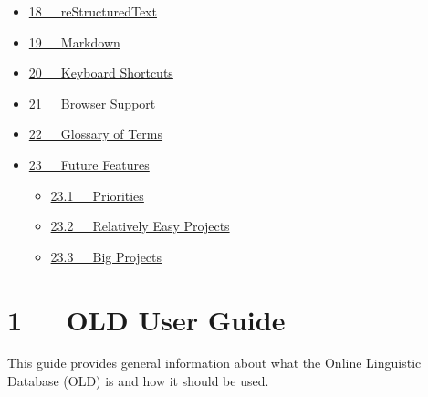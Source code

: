 \documentclass[letterpaper,10pt,english]{sphinxmanual}
\begin{document}
{\begin{minipage}{0.95\linewidth}
\begin{itemize}
\begin{itemize}
\item {} 
{\hyperref[user_guide:old-file-file-markup]{17.3   OLD File file Markup}}

\item {} 
{\hyperref[user_guide:old-image-embed-markup]{17.4   OLD Image Embed Markup}}

\item {} 
{\hyperref[user_guide:old-metalanguage-markup]{17.5   OLD Metalanguage Markup}}

\end{itemize}

\item {} 
{\hyperref[user_guide:restructuredtext]{18   reStructuredText}}

\item {} 
{\hyperref[user_guide:markdown]{19   Markdown}}

\item {} 
{\hyperref[user_guide:keyboard-shortcuts]{20   Keyboard Shortcuts}}

\item {} 
{\hyperref[user_guide:browser-support]{21   Browser Support}}

\item {} 
{\hyperref[user_guide:glossary-of-terms]{22   Glossary of Terms}}

\item {} 
{\hyperref[user_guide:future-features]{23   Future Features}}
\begin{itemize}
\item {} 
{\hyperref[user_guide:priorities]{23.1   Priorities}}

\item {} 
{\hyperref[user_guide:relatively-easy-projects]{23.2   Relatively Easy Projects}}

\item {} 
{\hyperref[user_guide:big-projects]{23.3   Big Projects}}

\end{itemize}

\end{itemize}
\end{minipage}}
\begin{center}\setlength{\fboxsep}{5pt}\end{center}


\chapter{1   OLD User Guide}
\label{user_guide:old-user-guide}\label{user_guide::doc}\label{user_guide:welcome-to-old-s-documentation}
This guide provides general information about what the Online Linguistic
Database (OLD) is and how it should be used.
\end{document}
